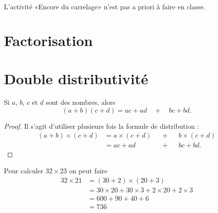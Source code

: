 L'activité «Encore du carrelage» n'est pas a priori à faire en classe.


\section{Factorisation}



\section{Double distributivité}





\begin{propriete}
    Si \( a\), \( b\), \( c\) et \( d\) sont des nombres, alors
    \begin{equation}
        (a+b)(c+d)=ac+ad\quad+\quad bc+bd.
    \end{equation}
\end{propriete}

\begin{proof}
    Il s'agit d'utiliser plusieurs fois la formule de distribution :
    \begin{subequations}
        \begin{align}
            (a+b)\times \boxed{(c+d)}&=a\times \boxed{(c+d)}&&+&& b\times \boxed{(c+d)}\\
            &=ac+ad  &&+&&bc+bd.
        \end{align}
    \end{subequations}
\end{proof}

\begin{example}
    Pour calculer \( 32\times 23 \) on peut faire
    \begin{subequations}
        \begin{align}
                32\times 21&=(30+2)\times (20+3)\\
                &=30\times 20+30\times 3+2\times 20+2\times 3\\
                &=600+90+40+6\\
                &=736
        \end{align}
    \end{subequations}
\end{example}


